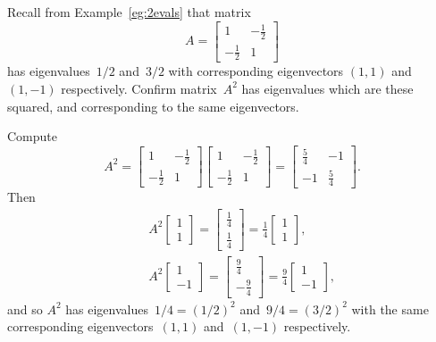 \begin{example} \label{eg:2x2sympow}
Recall from Example~\ref{eg:2evals} that matrix 
\begin{equation*}
A=\begin{bmatrix} 1&-\frac12\\-\frac12&1 \end{bmatrix}
\end{equation*}
has eigenvalues~\(1/2\) and~\(3/2\) with corresponding eigenvectors \((1,1)\) and~\((1,-1)\) respectively.
Confirm matrix~\(A^2\) has eigenvalues which are these squared, and corresponding to the same eigenvectors.
\begin{solution} 
Compute
\begin{equation*}
A^2=\begin{bmatrix} 1&-\frac12\\-\frac12&1 \end{bmatrix}
\begin{bmatrix} 1&-\frac12\\-\frac12&1 \end{bmatrix}
=\begin{bmatrix} \frac54&-1\\-1&\frac54 \end{bmatrix}.
\end{equation*}
Then
\begin{eqnarray*}
&&A^2\begin{bmatrix} 1\\1 \end{bmatrix}
=\begin{bmatrix} \frac14\\ \frac14 \end{bmatrix}
=\tfrac14\begin{bmatrix} 1\\1 \end{bmatrix},
\\&&A^2\begin{bmatrix} 1\\-1 \end{bmatrix}
=\begin{bmatrix} \frac94\\-\frac94 \end{bmatrix}
=\tfrac94\begin{bmatrix} 1\\-1 \end{bmatrix},
\end{eqnarray*}
and so \(A^2\) has eigenvalues~\(1/4=(1/2)^2\) and~\(9/4=(3/2)^2\) with the same corresponding eigenvectors~\((1,1)\) and~\((1,-1)\) respectively.
\end{solution}
\end{example}



